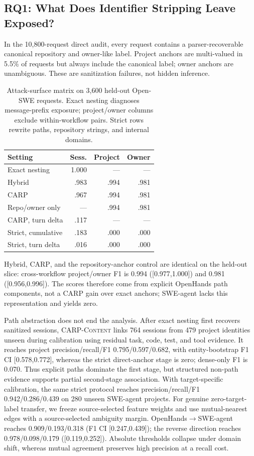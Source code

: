 \documentclass[letterpaper]{article}
\newcommand{\carp}{\textsc{CARP}\xspace}
\newcommand{\carpcontent}{\textsc{CARP-Content}\xspace}
\begin{document}
\subsection{RQ1: What Does Identifier Stripping Leave Exposed?}

In the 10,800-request direct audit, every request contains a parser-recoverable canonical repository
and owner-like label. Project anchors are multi-valued in 5.5\% of requests but always include the
canonical label; owner anchors are unambiguous. These are sanitization failures, not hidden inference.

\begin{table}[t]
\centering
\small
\begin{tabular}{@{}lrrr@{}}
\toprule
Setting & Sess. & Project & Owner \\
\midrule
Exact nesting & 1.000 & --- & --- \\
Hybrid & .983 & .994 & .981 \\
\carp & .967 & .994 & .981 \\
Repo/owner only & --- & .994 & .981 \\
\carp, turn delta & .117 & --- & --- \\
Strict, cumulative & .183 & .000 & .000 \\
Strict, turn delta & .016 & .000 & .000 \\
\bottomrule
\end{tabular}
\caption{Attack-surface matrix on 3,600 held-out Open-SWE requests. Exact nesting diagnoses
message-prefix exposure; project/owner columns exclude within-workflow pairs. Strict rows rewrite
paths, repository strings, and internal domains.}
\label{tab:openswe}
\end{table}

Hybrid, \carp, and the repository-anchor control are identical on the held-out slice:
cross-workflow project/owner F1 is 0.994 ([0.977,1.000]) and 0.981 ([0.956,0.996]). The scores
therefore come from explicit OpenHands path components, not a \carp gain over exact anchors;
SWE-agent lacks this representation and yields zero.

Path abstraction does not end the analysis. After exact nesting first recovers sanitized sessions,
\carpcontent links 764 sessions from 479 project identities unseen during calibration using residual
task, code, test, and tool evidence. It reaches project precision/recall/F1 0.795/0.597/0.682,
with entity-bootstrap F1 CI [0.578,0.772], whereas the strict direct-anchor stage is zero;
dense-only F1 is 0.070. Thus explicit paths dominate
the first stage, but structured non-path evidence supports partial second-stage association.
With target-specific calibration, the same strict protocol reaches precision/recall/F1
0.942/0.286/0.439 on 280 unseen SWE-agent projects. For genuine zero-target-label transfer, we
freeze source-selected feature weights and use mutual-nearest edges with a source-selected ambiguity
margin. OpenHands$\rightarrow$SWE-agent reaches 0.909/0.193/0.318 (F1 CI [0.247,0.439]); the reverse
direction reaches 0.978/0.098/0.179 ([0.119,0.252]). Absolute thresholds collapse under domain
shift, whereas mutual agreement preserves high precision at a recall cost.
\end{document}
